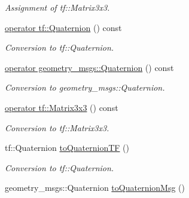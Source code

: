 \begin{DoxyCompactItemize}
\begin{DoxyCompactList}\small\item\em Assignment of tf\+::\+Matrix3x3. \end{DoxyCompactList}\item 
\hyperlink{classow__core_1_1RotationBase_a4973e8933d368390c212b85db5566563}{operator tf\+::\+Quaternion} () const \hypertarget{classow__core_1_1RotationBase_a4973e8933d368390c212b85db5566563}{}\label{classow__core_1_1RotationBase_a4973e8933d368390c212b85db5566563}

\begin{DoxyCompactList}\small\item\em Conversion to tf\+::\+Quaternion. \end{DoxyCompactList}\item 
\hyperlink{classow__core_1_1RotationBase_a7a363042df6768430e2f7081ed1bf198}{operator geometry\+\_\+msgs\+::\+Quaternion} () const \hypertarget{classow__core_1_1RotationBase_a7a363042df6768430e2f7081ed1bf198}{}\label{classow__core_1_1RotationBase_a7a363042df6768430e2f7081ed1bf198}

\begin{DoxyCompactList}\small\item\em Conversion to geometry\+\_\+msgs\+::\+Quaternion. \end{DoxyCompactList}\item 
\hyperlink{classow__core_1_1RotationBase_af153fd37d2f9597d752fc7cb09da465b}{operator tf\+::\+Matrix3x3} () const \hypertarget{classow__core_1_1RotationBase_af153fd37d2f9597d752fc7cb09da465b}{}\label{classow__core_1_1RotationBase_af153fd37d2f9597d752fc7cb09da465b}

\begin{DoxyCompactList}\small\item\em Conversion to tf\+::\+Matrix3x3. \end{DoxyCompactList}\item 
tf\+::\+Quaternion \hyperlink{classow__core_1_1RotationBase_a3ad33f0aa81ef2900ade9d84bde0ae0c}{to\+Quaternion\+TF} ()\hypertarget{classow__core_1_1RotationBase_a3ad33f0aa81ef2900ade9d84bde0ae0c}{}\label{classow__core_1_1RotationBase_a3ad33f0aa81ef2900ade9d84bde0ae0c}

\begin{DoxyCompactList}\small\item\em Conversion to tf\+::\+Quaternion. \end{DoxyCompactList}\item 
geometry\+\_\+msgs\+::\+Quaternion \hyperlink{classow__core_1_1RotationBase_a0e082cd4dca253a48532b56d4951bb57}{to\+Quaternion\+Msg} ()\hypertarget{classow__core_1_1RotationBase_a0e082cd4dca253a48532b56d4951bb57}{}\label{classow__core_1_1RotationBase_a0e082cd4dca253a48532b56d4951bb57}


\end{DoxyCompactItemize}
